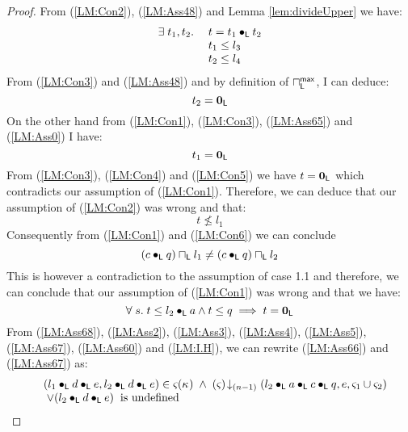 \begin{lemma}[]
\begin{proof}
%
From (\ref{LM:Con2}), (\ref{LM:Ass48}) and Lemma \ref{lem:divideUpper} we have:
%
\begin{align}
	\begin{array}{l l}
		\exists\; t_1, t_2.\; & t = t_1 \bullet_{\textsf{L}} t_2\\
		& t_1 \leq l_3\\
		& t_2 \leq l_4
	\end{array} \label{LM:Con3}
\end{align}
%
From (\ref{LM:Con3}) and (\ref{LM:Ass48}) and by definition of $\sqcap_{\textsf{L}}^{\textsf{max}}$, I can deduce: 
%
\begin{equation}
	t_2 = \mathbf{0}_{\textsf{L}} \label{LM:Con4}
\end{equation}
%
On the other hand from (\ref{LM:Con1}), (\ref{LM:Con3}), (\ref{LM:Ass65}) and (\ref{LM:Ass0}) I have: 
%
\begin{equation}
	t_1 = \mathbf{0}_{\textsf{L}} \label{LM:Con5}
\end{equation}
% 
From (\ref{LM:Con3}), (\ref{LM:Con4}) and (\ref{LM:Con5}) we have $t = \mathbf{0}_{\textsf{L}}$ which contradicts our assumption of (\ref{LM:Con1}). Therefore, we can deduce that our assumption of (\ref{LM:Con2}) was wrong and that:
%
\begin{equation}
	t \not\leq l_1 \label{LM:Con6}
\end{equation}
%
Consequently from (\ref{LM:Con1}) and (\ref{LM:Con6}) we can conclude
%
\begin{equation}
	(c \bullet_{\textsf{L}} q) \sqcap_{\textsf{L}} l_1 \not= (c \bullet_{\textsf{L}} q) \sqcap_{\textsf{L}} l_2 \nonumber
\end{equation}
%
This is however a contradiction to the assumption of case 1.1 and therefore, we can conclude that our assumption of (\ref{LM:Con1}) was wrong and that we have:
%
\begin{equation}
	\forall\; s.\; t\leq l_2 \bullet_{\textsf{L}} a \land t \leq  q \implies t = \mathbf{0}_{\textsf{L}} \label{LM:Ass60}
\end{equation}
%
From (\ref{LM:Ass68}), (\ref{LM:Ass2}), (\ref{LM:Ass3}), (\ref{LM:Ass4}), (\ref{LM:Ass5}), (\ref{LM:Ass67}), (\ref{LM:Ass60}) and (\ref{LM:I.H}), we can rewrite (\ref{LM:Ass66}) and (\ref{LM:Ass67}) as:
%
\begin{align}
	\begin{array}{l l}
		& (l_1 \bullet_{\textsf{L}} d \bullet_{\textsf{L}} e, l_2 \bullet_{\textsf{L}} d \bullet_{\textsf{L}} e) \in \varsigma_{}(\kappa_{}) \;\land\;
		\left(\varsigma_{}\right) \!\downarrow_{(n-1)} \left(l_2 \bullet_{\textsf{L}} a \bullet_{\textsf{L}} c \bullet_{\textsf{L}} q, e, \varsigma_{1} \cup \varsigma_{2}\right)\\
		& \;\lor (l_2 \bullet_{\textsf{L}} d \bullet_{\textsf{L}} e)\hspace*{0.2cm}\text{is undefined}

\end{array}
\end{align}
\end{proof}
\end{lemma}
